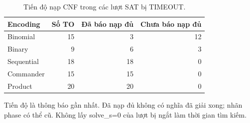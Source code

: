 \begin{table}[pos=H]
\centering
\small
\caption{Tiến độ nạp CNF trong các lượt SAT bị TIMEOUT.}
\label{tab:timeout_progress}
\setlength{\tabcolsep}{4pt}
\begin{tabular}{@{}lrrr@{}}
\toprule
Encoding & Số TO & Đã báo nạp đủ & Chưa báo nạp đủ \\
\midrule
Binomial & 15 & 3 & 12 \\
Binary & 9 & 6 & 3 \\
Sequential & 18 & 18 & 0 \\
Commander & 15 & 15 & 0 \\
Product & 20 & 20 & 0 \\
\bottomrule
\end{tabular}
\par\smallskip\begin{minipage}{\linewidth}\footnotesize Tiến độ là thông báo gần nhất. Đã nạp đủ không có nghĩa đã giải xong; nhãn phase có thể cũ. Không lấy solve\_s=0 của lượt bị ngắt làm thời gian tìm kiếm.\end{minipage}
\end{table}
